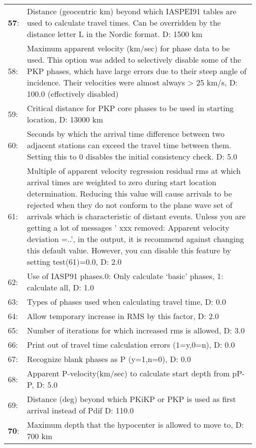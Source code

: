 \begin{longtable}{lp{14.5cm}}
\textbf{57}: &  Distance (geocentric km) beyond which \index{IASPEI91}IASPEI91 tables are used to calculate travel times. Can be overridden by the distance letter L in the Nordic format. D: 1500 km \\
58: &  	Maximum \index{Apparent velocity}apparent velocity (km/sec) for phase data to be used. This option was added to selectively disable some of the PKP phases, which have large errors due to their steep angle of incidence. Their velocities were almost always > 25 km/s, D: 100.0 (effectively disabled) \\
59: &  	Critical distance for PKP core phases to be used in starting location, D: 13000 km \\
60: &  	Seconds by which the arrival time difference between two adjacent station\index{Travel time error}s can exceed the travel time between them. Setting this to 0 disables the initial \index{Consistency check}consistency check. D: 5.0 \\
61: &  	Multiple of apparent velocity regression residual rms at which arrival times are weighted to zero during start location determination. Reducing this value will cause arrivals to be rejected when they do not conform to the plane wave set of arrivals which is chara\index{Starting location}cteristic of distant events. Unless you are getting a lot of messages ' xxx removed: Apparent velocity deviation =..', in the output, it is recommend against changing this default value. However, you can disable this feature by setting test(61)=0.0, D: 2.0 \\
62: &  	Use of IASP91 phases\index{IASPEI phases}.0: Only calculate `basic' phases, 1: calculate all, 
D: 1.0 \\
63: &  	Types of phases used when calculating travel time, D: 0.0 \\
64: &  	Allow temporary increase in RMS by this factor, D: 2.0 \\
65: &  	Number of iterations for which increased rms is allowed, D: 3.0 \\
66: &  	Print out of travel time calculation errors (1=y,0=n), D: 0.0 \\
67: &  	Recognize blank phases as P (y=1,n=0), D: 0.0 \\
68: &  	Apparent P-velocity(km/sec) to calculate start depth from pP-P, D: 5.0 \\
69: &  	Distance (deg) beyond which PKiKP or PKP is used as first arrival instead of Pdif D: 110.0 \\
\textbf{70}: &  	Maximum depth that the hypocenter is allowed to move to, D: 700 km \\

\end{longtable}
